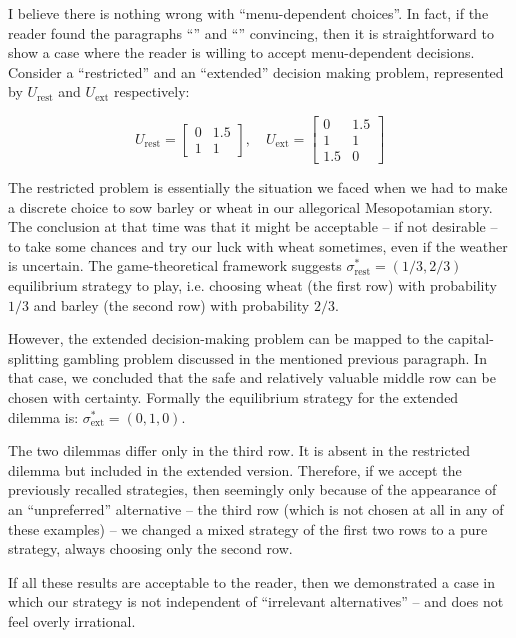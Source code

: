 \documentclass{article}
\begin{document}
I believe there is nothing wrong with ``menu-dependent choices''. In fact, if the reader found the paragraphs ``\textbf{}'' and ``\textbf{}'' convincing, then it is straightforward to show a case where the reader is willing to accept menu-dependent decisions.
Consider a ``restricted'' and an ``extended'' decision making problem, represented by $U_{\text{rest}}$ and $U_{\text{ext}}$ respectively:

\[
U_{\text{rest}} =
\begin{bmatrix}
    0 & 1.5 \\
    1 & 1
\end{bmatrix},
\quad
U_{\text{ext}} =
\begin{bmatrix}
    0 & 1.5 \\
    1 & 1 \\
    1.5 & 0
\end{bmatrix}
\]

The restricted problem is essentially the situation we faced when we had to make a discrete choice to sow barley or wheat in our allegorical Mesopotamian story.
The conclusion at that time was that it might be acceptable -- if not desirable -- to take some chances and try our luck with wheat sometimes, even if the weather is uncertain. The game-theoretical framework suggests $\sigma^*_\text{rest} = (1/3,2/3)$ equilibrium strategy to play, i.e. choosing wheat (the first row) with probability $1/3$ and barley (the second row) with probability $2/3$.

However, the extended decision-making problem can be mapped to the capital-splitting gambling problem discussed in the mentioned previous paragraph. In that case, we concluded that the safe and relatively valuable middle row can be chosen with certainty. Formally the equilibrium strategy for the extended dilemma is: $\sigma^*_\text{ext} = (0, 1, 0)$.

The two dilemmas differ only in the third row. It is absent in the restricted dilemma but included in the extended version.
Therefore, if we accept the previously recalled strategies, then seemingly only because of the appearance of an ``unpreferred'' alternative -- the third row (which is not chosen at all in any of these examples) -- we changed a mixed strategy of the first two rows to a pure strategy, always choosing only the second row.

If all these results are acceptable to the reader, then we demonstrated a case in which our strategy is not independent of ``irrelevant alternatives'' -- and does not feel overly irrational.
\end{document}
